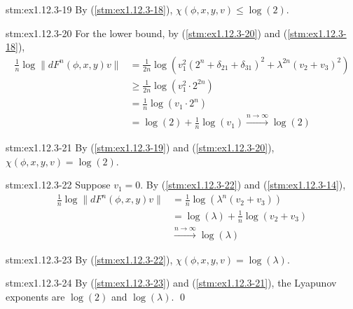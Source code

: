 \begin{statement}{stm:ex1.12.3-19}
By (\ref{stm:ex1.12.3-18}), $\chi(\phi, x, y, v) \le \log(2)$.
\end{statement}

\begin{statement}{stm:ex1.12.3-20}
For the lower bound, by (\ref{stm:ex1.12.3-20}) and (\ref{stm:ex1.12.3-18}),
\begin{align*}
\frac{1}{n} \log \| dF^n(\phi, x, y)v \| 
&= \frac{1}{2n} \log \left( v_1^2(2^n + \delta_{21} + \delta_{31})^2 + \lambda^{2n}(v_2 + v_3)^2 \right) \\
&\ge \frac{1}{2n} \log \left( v_1^2 \cdot 2^{2n} \right) \\
&= \frac{1}{n} \log (v_1 \cdot 2^n) \\
&= \log(2) + \frac{1}{n} \log(v_1) \xrightarrow{n \to \infty} \log(2)
\end{align*}
\end{statement}


\begin{statement}{stm:ex1.12.3-21}
By (\ref{stm:ex1.12.3-19}) and (\ref{stm:ex1.12.3-20}), $\chi(\phi, x, y, v) = \log(2)$.
\end{statement}

\begin{statement}{stm:ex1.12.3-22}
Suppose $v_1 = 0$. By (\ref{stm:ex1.12.3-22}) and (\ref{stm:ex1.12.3-14}),
\begin{align*}
\frac{1}{n} \log \| dF^n(\phi, x, y)v \| 
&= \frac{1}{n} \log (\lambda^n (v_2 + v_3)) \\
&= \log(\lambda) + \frac{1}{n} \log(v_2 + v_3) \\
&\xrightarrow{n \to \infty} \log(\lambda)
\end{align*}
\end{statement}

\begin{statement}{stm:ex1.12.3-23}
By (\ref{stm:ex1.12.3-22}), $\chi(\phi, x, y, v) = \log(\lambda)$.
\end{statement}

\begin{statement}{stm:ex1.12.3-24}
By (\ref{stm:ex1.12.3-23}) and (\ref{stm:ex1.12.3-21}), the Lyapunov exponents are $\log(2)$ and $\log(\lambda)$. \qed
\end{statement}
